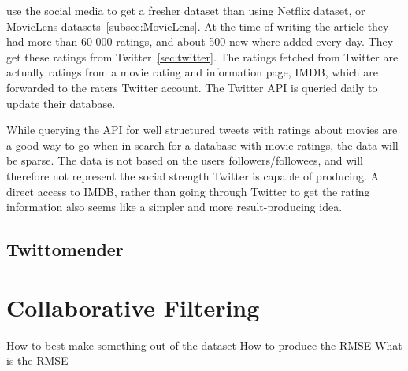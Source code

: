 use the social media to get a fresher dataset than using Netflix dataset, or MovieLens datasets~\ref{subsec:MovieLens}. At the time of writing the article they had more than 60 000 ratings, and about 500 new where added every day\cite{MovieTweetings}. They get these ratings from Twitter~\ref{sec:twitter}. The ratings fetched from Twitter are actually ratings from a movie rating and information page, IMDB, which are forwarded to the raters Twitter account. The Twitter API is queried daily to update their database.

While querying the API for well structured tweets with ratings about movies are a good way to go when in search for a database with movie ratings, the data will be sparse. The data is not based on the users followers/followees, and will therefore not represent the social strength Twitter is capable of producing. A direct access to IMDB, rather than going through Twitter to get the rating information also seems like a simpler and more result-producing idea.


\subsection{Twittomender}
\cite{twittomender}







\section{Collaborative Filtering}


How to best make something out of the dataset
How to produce the RMSE
What is the RMSE


